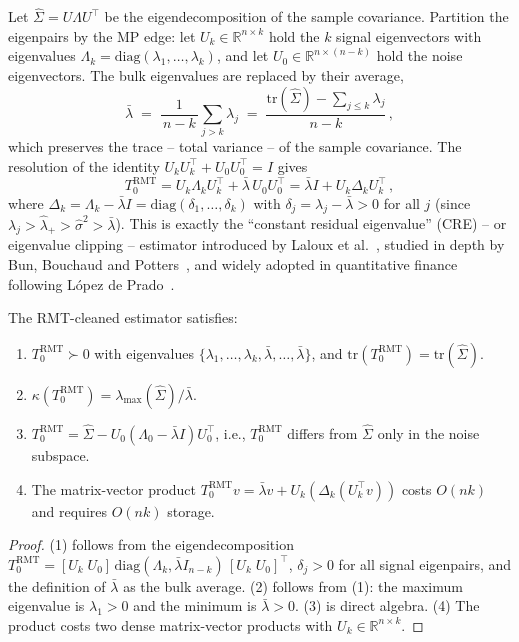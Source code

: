 Let $\hat\Sigma = U\Lambda U^\top$ be the eigendecomposition of the sample
covariance. Partition the eigenpairs by the MP edge: let
$U_k \in \mathbb{R}^{n \times k}$ hold the $k$ signal eigenvectors with
eigenvalues $\Lambda_k = \mathrm{diag}(\lambda_1, \ldots, \lambda_k)$, and let
$U_0 \in \mathbb{R}^{n \times (n-k)}$ hold the noise eigenvectors. The bulk
eigenvalues are replaced by their average,
\[
  \bar\lambda
  \;=\; \frac{1}{\,n-k\,}\sum_{j > k} \lambda_j
  \;=\; \frac{\mathrm{tr}(\hat\Sigma) - \sum_{j \leq k}\lambda_j}{n-k}\,,
\]
which preserves the trace -- total variance -- of the sample covariance.
The resolution of the identity $U_k U_k^\top + U_0 U_0^\top = I$ gives
\[
  T_0^{\mathrm{RMT}}
  = U_k \Lambda_k U_k^\top + \bar\lambda\, U_0 U_0^\top
  = \bar\lambda I + U_k \Delta_k U_k^\top\,,
\]
where
$\Delta_k = \Lambda_k - \bar\lambda I = \mathrm{diag}(\delta_1, \ldots, \delta_k)$
with $\delta_j = \lambda_j - \bar\lambda > 0$ for all $j$ (since
$\lambda_j > \hat\lambda_+ > \hat\sigma^2 > \bar\lambda$).
This is exactly the ``constant residual eigenvalue'' (CRE) -- or eigenvalue
clipping -- estimator introduced by Laloux et
al.~\cite{laloux1999}, studied in depth by Bun, Bouchaud and
Potters~\cite{bun2017}, and widely adopted in quantitative finance following
L\'opez de Prado~\cite{lopezdeprado2018}.

\begin{proposition}\label{prop:rmt_spectrum}
The RMT-cleaned estimator satisfies:
\begin{enumerate}
  \item $T_0^{\mathrm{RMT}} \succ 0$ with eigenvalues
        $\{\lambda_1, \ldots, \lambda_k, \bar\lambda, \ldots, \bar\lambda\}$,
        and $\mathrm{tr}(T_0^{\mathrm{RMT}}) = \mathrm{tr}(\hat\Sigma)$.
  \item $\kappa(T_0^{\mathrm{RMT}}) = \lambda_{\max}(\hat\Sigma) / \bar\lambda$.
  \item $T_0^{\mathrm{RMT}} = \hat\Sigma - U_0(\Lambda_0 - \bar\lambda I)U_0^\top$,
        i.e., $T_0^{\mathrm{RMT}}$ differs from $\hat\Sigma$ only in the noise subspace.
  \item The matrix-vector product $T_0^{\mathrm{RMT}} v = \bar\lambda v + U_k(\Delta_k(U_k^\top v))$
        costs $O(nk)$ and requires $O(nk)$ storage.
\end{enumerate}
\end{proposition}

\begin{proof}
(1) follows from the eigendecomposition $T_0^{\mathrm{RMT}} = [U_k\;U_0]\,
\mathrm{diag}(\Lambda_k, \bar\lambda I_{n-k})\,[U_k\;U_0]^\top$,
$\delta_j > 0$ for all signal eigenpairs, and the definition of $\bar\lambda$
as the bulk average.
(2) follows from (1): the maximum eigenvalue is $\lambda_1 > 0$ and the minimum
is $\bar\lambda > 0$.
(3) is direct algebra.
(4) The product costs two dense matrix-vector products with $U_k \in \mathbb{R}^{n \times k}$.
\end{proof}

